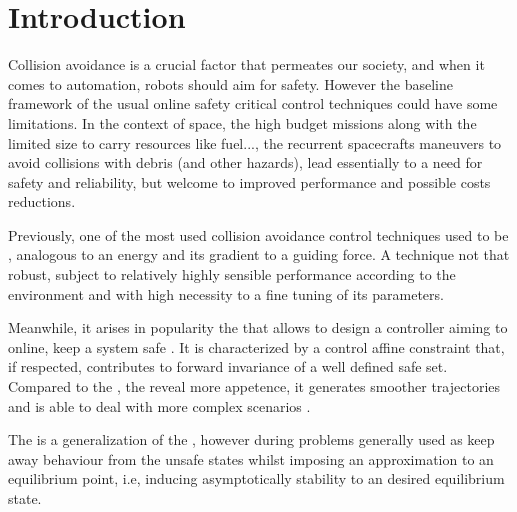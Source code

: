 
%

\chapter{Introduction}
\label{cha:introduction}

Collision avoidance is a crucial factor that permeates our society, and when it comes to automation, robots should aim for safety. However the baseline framework of the usual online safety critical control techniques could have some limitations. In the context of space, the high budget missions along with the limited size to carry resources like fuel..., the recurrent spacecrafts maneuvers to avoid collisions with debris \cite{hall2014history} (and other hazards), lead essentially to a need for safety and reliability, but welcome to improved performance and possible costs reductions.  

Previously, one of the most used collision avoidance control techniques used to be  \cite{krogh1984generalized, khatib1986real}, analogous to an energy and its gradient to a guiding force. A technique not that robust, subject to relatively highly sensible performance according to the environment and with high necessity to a fine tuning of its parameters. 

Meanwhile, it arises in popularity the  that allows to design a controller aiming to online, keep a system safe \cite{ames2019control}. It is characterized by a control affine constraint that, if respected, contributes to forward invariance of a well defined safe set. Compared to the , the  reveal more appetence, it generates smoother trajectories and is able to deal with more complex scenarios \cite{singletary2021comparative}.

The  is a generalization of the  \cite{sontag1983lyapunov, ames2014rapidly}, however during problems generally used as keep away behaviour from the unsafe states whilst  imposing an approximation to an equilibrium point, i.e, inducing asymptotically stability to an desired equilibrium state. 

